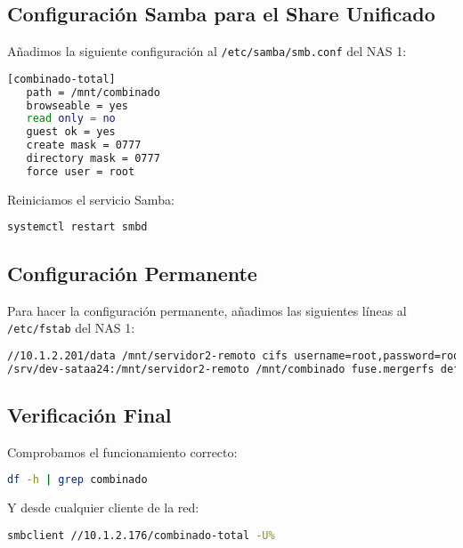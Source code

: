 \documentclass[12pt, a4paper]{article}
\begin{document}
\subsection{Configuración Samba para el Share Unificado}
Añadimos la siguiente configuración al \texttt{/etc/samba/smb.conf} del NAS 1: \\

\begin{lstlisting}[language=bash, caption=Share unificado en Samba.]
[combinado-total]
   path = /mnt/combinado
   browseable = yes
   read only = no
   guest ok = yes
   create mask = 0777
   directory mask = 0777
   force user = root
\end{lstlisting}

Reiniciamos el servicio Samba: \\
\begin{lstlisting}[language=bash]
systemctl restart smbd
\end{lstlisting}

\subsection{Configuración Permanente}
Para hacer la configuración permanente, añadimos las siguientes líneas al \texttt{/etc/fstab} del NAS 1: \\

\begin{lstlisting}[language=bash, caption=Configuración permanente en fstab.]
//10.1.2.201/data /mnt/servidor2-remoto cifs username=root,password=root,vers=3.0 0 0
/srv/dev-sataa24:/mnt/servidor2-remoto /mnt/combinado fuse.mergerfs defaults,allow_other,category.create=epmfs 0 0
\end{lstlisting}

\subsection{Verificación Final}
Comprobamos el funcionamiento correcto: \\

\begin{lstlisting}[language=bash, caption=Verificación del espacio unificado.]
df -h | grep combinado
\end{lstlisting}

Y desde cualquier cliente de la red: \\
\begin{lstlisting}[language=bash, caption=Acceso al share unificado.]
smbclient //10.1.2.176/combinado-total -U%
\end{lstlisting}
\end{document}
